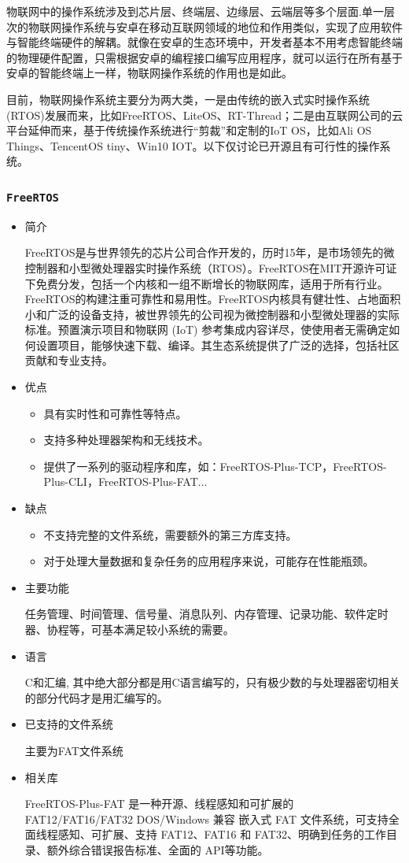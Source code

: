\documentclass[UTF8,a4paper]{ctexart}
\begin{document}
物联网中的操作系统涉及到芯片层、终端层、边缘层、云端层等多个层面.单一层次的物联网操作系统与安卓在移动互联网领域的地位和作用类似，实现了应用软件与智能终端硬件的解耦。就像在安卓的生态环境中，开发者基本不用考虑智能终端的物理硬件配置，只需根据安卓的编程接口编写应用程序，就可以运行在所有基于安卓的智能终端上一样，物联网操作系统的作用也是如此。

目前，物联网操作系统主要分为两大类，一是由传统的嵌入式实时操作系统(RTOS)发展而来，比如FreeRTOS、LiteOS、RT-Thread；二是由互联网公司的云平台延伸而来，基于传统操作系统进行“剪裁”和定制的IoT OS，比如Ali OS Things、TencentOS tiny、Win10 IOT。以下仅讨论已开源且有可行性的操作系统。

\subsubsection{\texttt{FreeRTOS}}
\begin{itemize}
\item 简介

FreeRTOS是与世界领先的芯片公司合作开发的，历时15年，是市场领先的微控制器和小型微处理器实时操作系统（RTOS）。FreeRTOS在MIT开源许可证下免费分发，包括一个内核和一组不断增长的物联网库，适用于所有行业。FreeRTOS的构建注重可靠性和易用性。FreeRTOS内核具有健壮性、占地面积小和广泛的设备支持，被世界领先的公司视为微控制器和小型微处理器的实际标准。预置演示项目和物联网 (IoT) 参考集成内容详尽，使使用者无需确定如何设置项目，能够快速下载、编译。其生态系统提供了广泛的选择，包括社区贡献和专业支持。

\item 优点
\begin{itemize}
    \item 具有实时性和可靠性等特点。
    \item 支持多种处理器架构和无线技术。
    \item 提供了一系列的驱动程序和库，如：FreeRTOS-Plus-TCP，FreeRTOS-Plus-CLI，FreeRTOS-Plus-FAT...   
\end{itemize}
\item 缺点
\begin{itemize}
    \item 不支持完整的文件系统，需要额外的第三方库支持。
    \item 对于处理大量数据和复杂任务的应用程序来说，可能存在性能瓶颈。     
\end{itemize}
\item 主要功能

任务管理、时间管理、信号量、消息队列、内存管理、记录功能、软件定时器、协程等，可基本满足较小系统的需要。
\item 语言

C和汇编, 其中绝大部分都是用C语言编写的，只有极少数的与处理器密切相关的部分代码才是用汇编写的。
\item 已支持的文件系统

主要为FAT文件系统
\item 相关库

FreeRTOS-Plus-FAT 是一种开源、线程感知和可扩展的 FAT12/FAT16/FAT32 DOS/Windows 兼容 嵌入式 FAT 文件系统，可支持全面线程感知、可扩展、支持 FAT12、FAT16 和 FAT32、明确到任务的工作目录、额外综合错误报告标准、全面的 API等功能。
\end{itemize}
\end{document}
